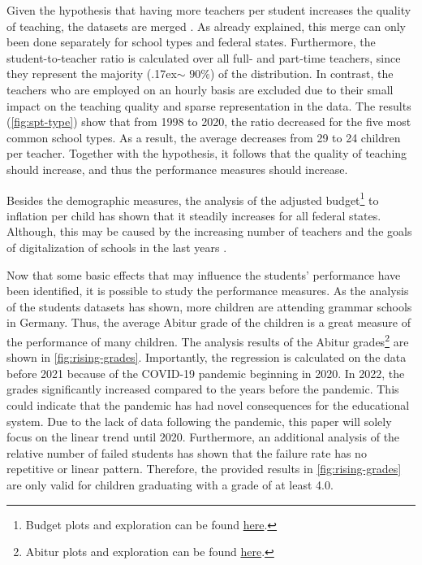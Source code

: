 Given the hypothesis that having more teachers per student increases the quality of teaching, the datasets are merged \cite{kasau_onesmus_mulei_pupil-teacher_2016,koc_impact_2015}. As already explained, this merge can only been done separately for school types and federal states. Furthermore, the student-to-teacher ratio is calculated over all full- and part-time teachers, since they represent the majority ({\raise.17ex\hbox{$\scriptstyle\mathtt{\sim}$}} $90\%$) of the distribution. In contrast, the teachers who are employed on an hourly basis are excluded due to their small impact on the teaching quality and sparse representation in the data. The results (\autoref{fig:spt-type}) show that from 1998 to 2020, the ratio decreased for the five most common school types. As a result, the average decreases from 29 to 24 children per teacher. Together with the hypothesis, it follows that the quality of teaching should increase, and thus the performance measures should increase.

Besides the demographic measures, the analysis of the adjusted budget\footnote{\label{footnote:budget}Budget plots and exploration can be found \href{https://github.com/KarylReyne/DataLiteracyWS23/blob/main/exp/TF-007-SchoolBudgets.ipynb}{here}.} to inflation per child has shown that it steadily increases for all federal states. Although, this may be caused by the increasing number of teachers and the goals of digitalization of schools in the last years \cite{cone_pandemic_2022}.

Now that some basic effects that may influence the students' performance have been identified, it is possible to study the performance measures. As the analysis of the students datasets has shown, more children are attending grammar schools in Germany. Thus, the average Abitur grade of the children is a great measure of the performance of many children. The analysis results of the Abitur grades\footnote{\label{footnote:abi}Abitur plots and exploration can be found \href{https://github.com/KarylReyne/DataLiteracyWS23/blob/main/exp/TF-001-ExploreABIGrades.ipynb}{here}.} are shown in \autoref{fig:rising-grades}. Importantly, the regression is calculated on the data before 2021 because of the COVID-19 pandemic beginning in 2020. In 2022, the grades significantly increased compared to the years before the pandemic. This could indicate that the pandemic has had novel consequences for the educational system. Due to the lack of data following the pandemic, this paper will solely focus on the linear trend until 2020. Furthermore, an additional analysis of the relative number of failed students has shown that the failure rate has no repetitive or linear pattern. Therefore, the provided results in \autoref{fig:rising-grades} are only valid for children graduating with a grade of at least 4.0.

